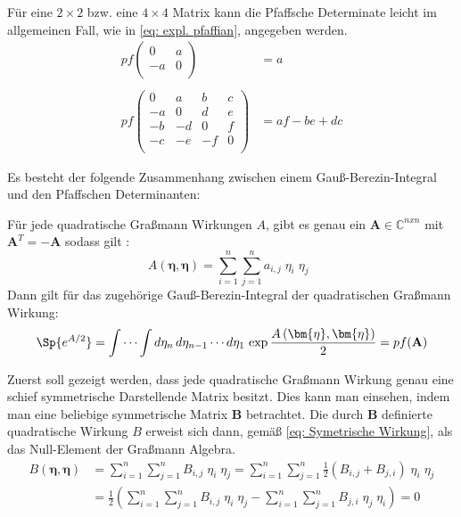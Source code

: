 \noindent Für eine $2\times2$ bzw. eine $4\times4$ Matrix kann die Pfaffsche Determinate leicht im allgemeinen Fall, wie in \eqref{eq: expl. pfaffian}, angegeben werden.
\begin{align}
pf\left(\begin{array}{cc}  
        0  &  a  \\
        -a &  0  \\
        \end{array} \right) &= a \nonumber \\
\label{eq: expl. pfaffian}\\
pf\left(\begin{array}{cccc}  
        0  &  a  &  b & c \\
        -a &  0  &  d & e \\
        -b & -d  &  0 & f \\
        -c & -e  & -f & 0 \\
        \end{array} \right) &= af - be +dc \nonumber 
\end{align}

\noindent Es besteht der folgende Zusammenhang zwischen einem Gauß-Berezin-Integral und den Pfaffschen Determinanten:

\begin{grayframe}[frametitle = {Gauß-Berezin-Integrale}]
Für jede quadratische Graßmann Wirkungen $A$, gibt es genau ein $ \mathbf{A}\in\mathbb{C}^{nxn}$ mit $\mathbf{A}^T = -\mathbf{A}$ sodass gilt :
    \begin{equation} \label{Satz: Gauß-Berezin 1}
        A\left(\bm{\eta}, \bm{\eta} \right) = \sum_{i=1}^n \sum_{j=1}^n a_{i,j}\; \eta_i\; \eta_j  \;\;
    \end{equation}
Dann gilt für das zugehörige Gauß-Berezin-Integral der quadratischen Graßmann Wirkung:
    \begin{equation} \label{Satz: Gauß-Berezin 2}
        \Sp{e^{A/2}} = \int \cdots \int d\eta_n\,d\eta_{n-1}\cdots d\eta_1\, \exp{\frac{A\left(\bm{\eta}, \bm{\eta}\right)}{2}} = pf(\mathbf{A}) 
    \end{equation}
\end{grayframe}

\noindent Zuerst soll gezeigt werden, dass jede quadratische Graßmann Wirkung genau eine schief symmetrische Darstellende Matrix besitzt. Dies kann man einsehen, indem man eine beliebige symmetrische Matrix $\bm{B}$ betrachtet. Die durch $\bm{B}$ definierte quadratische Wirkung $B$ erweist sich dann, gemäß \eqref{eq: Symetrische Wirkung}, als das Null-Element der Graßmann Algebra. 
\begin{align}
B\left(\bm{\eta}, \bm{\eta}\right) 
    & = \sum_{i=1}^n \sum_{j=1}^n B_{i,j}\; \eta_i\; \eta_j = \sum_{i=1}^n \sum_{j=1}^n \frac{1}{2} (B_{i,j} + B_{j,i})\; \eta_i\; \eta_j \nonumber \\
    & =  \frac{1}{2}\left( \sum_{i=1}^n \sum_{j=1}^n B_{i,j}\; \eta_i\; \eta_j - \sum_{i=1}^n \sum_{j=1}^n B_{j,i}\; \eta_j\; \eta_i\right)  = 0 \label{eq: Symetrische Wirkung}
\end{align}

